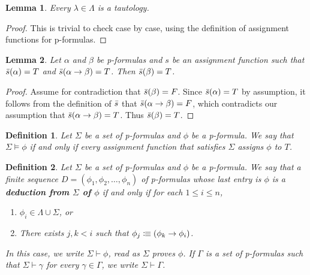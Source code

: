 \documentclass[leqno]{article}
\newtheorem{lemma}{Lemma}[section]
\newtheorem{definition}{Definition}[section]
\newcommand{\proves}{\vdash}
\newcommand{\is}{\colonequiv}
\newcommand{\limplies}{\rightarrow}
\begin{document}
\begin{lemma} \label{lemma_propAxiomsAreTautologies}
    Every $\lambda \in \Lambda$ is a tautology.
\end{lemma}

\begin{proof}
     This is trivial to check case by case, using the definition of assignment functions for p-formulas.
\end{proof}

\begin{lemma} \label{lemma_modusPonens}
    Let $\alpha$ and $\beta$ be p-formulas and $s$ be an assignment function such that $\Bar{s}(\alpha) = T$ and $\Bar{s}(\alpha \limplies \beta) = T$. Then $\Bar{s}(\beta) = T$.
\end{lemma}

\begin{proof}
     Assume for contradiction that $\Bar{s}(\beta) = F$. Since $\Bar{s}(\alpha) = T$ by assumption, it follows from the definition of $\Bar{s}$ that $\Bar{s}(\alpha \limplies \beta) = F$, which contradicts our assumption that $\Bar{s}(\alpha \limplies \beta) = T$. Thus $\Bar{s}(\beta) = T$.
\end{proof}

\begin{definition}
    Let $\Sigma$ be a set of p-formulas and $\phi$ be a p-formula. We say that $\Sigma \models \phi$ if and only if every assignment function that satisfies $\Sigma$ assigns $\phi$ to $T$.
\end{definition}

\begin{definition}
    Let $\Sigma$ be a set of p-formulas and $\phi$ be a p-formula. We say that a finite sequence $D = (\phi_1, \phi_2, \dots, \phi_n)$ of p-formulas whose last entry is $\phi$ is a \textbf{deduction from $\Sigma$ of $\phi$} if and only if for each $1 \leq i \leq n$,
    
    \begin{enumerate}
        \item $\phi_i \in \Lambda \cup \Sigma$, or
        \item There exists $j,k < i$ such that $\phi_j \is (\phi_k \limplies \phi_i)$.
    \end{enumerate} In this case, we write $\Sigma \proves \phi$, read as $\Sigma$ proves $\phi$. If $\Gamma$ is a set of p-formulas such that $\Sigma \proves \gamma$ for every $\gamma \in \Gamma$, we write $\Sigma \proves \Gamma$.
\end{definition}
\end{document}
